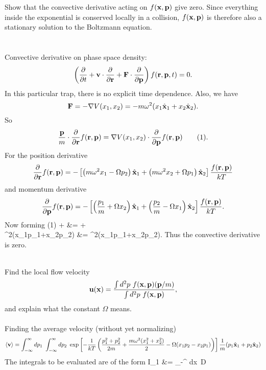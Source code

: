 \documentclass[11pt,letterpaper]{article}
\begin{document}
	\benum
		\item
            	Show that the convective derivative acting on $f(\mathbf{x},\mathbf{p})$ give zero. Since everything inside
		the exponential is conserved locally in a collision, $f(\mathbf{x},\mathbf{p})$ is therefore also a 
		stationary solution to the Boltzmann equation.
            	\\
		\\
		\\
		Convective derivative on phase space density:
		\[
			\left(\frac{\partial}{\partial t} +\mathbf{v}\cdot \frac{\partial}{\partial\mathbf{r}}+\mathbf{F}\cdot \frac{\partial}{\partial\mathbf{p}}\right)f(\mathbf{r},\mathbf{p},t) = 0.
		\]
		In this particular trap, there is no explicit time dependence. Also, we have
		\[
			\mathbf{F} = -\nabla V(x_1,x_2) = -m\omega^2(x_1\hat{\mathbf{x}}_1+x_2\hat{\mathbf{x}}_2).
		\]
		So
		\[
			\frac{\mathbf{p}}{m} \cdot\frac{\partial}{\partial\mathbf{r}}f(\mathbf{r},\mathbf{p}) = \nabla V(x_1,x_2)\cdot \frac{\partial}{\partial\mathbf{p}}
			f(\mathbf{r},\mathbf{p})\tag{1}.
		\]
		For the position derivative
		\[
			\frac{\partial}{\partial\mathbf{r}}f(\mathbf{r},\mathbf{p}) = -\left[ \left( m\omega^2 x_1-\Omega p_2\right)\hat{\mathbf{x}}_1+
			 \left( m\omega^2 x_2+\Omega p_1\right)\hat{\mathbf{x}}_2\right]\frac{f(\mathbf{r},\mathbf{p})}{kT}
		\]
		and momentum derivative
		\[
			\frac{\partial}{\partial\mathbf{p}}f(\mathbf{r},\mathbf{p}) = -\left[ \left( \frac{p_1}{m}+\Omega x_2\right)\hat{\mathbf{x}}_1 + 
			\left( \frac{p_2}{m}-\Omega x_1\right)\hat{\mathbf{x}}_2 \right]\frac{f(\mathbf{r},\mathbf{p})}{kT}.
		\]
		Now forming (1)
		\ba
			 + 
			 &= 
			 +
			 \\
			\omega^2(x_1p_1+x_2p_2) &= \omega^2(x_1p_1+x_2p_2).
		\ea
		Thus the convective derivative is zero.
		\\
		\\
		\item
		Find the local flow velocity 
		\[
			\mathbf{u}(\mathbf{x}) = \frac{\int d^2p\ f(\mathbf{x},\mathbf{p})(\mathbf{p}/m)}
			{\int d^2p\ f(\mathbf{x},\mathbf{p})},
		\]
		and explain what the constant $\Omega$ means.
		\\ \\
		Finding the average velocity (without yet normalizing)
		\[
			\braket{\vect v} = \int_{-\infty}^{\infty} dp_1\ \int_{-\infty}^{\infty} dp_2\ 
			\exp\blr{-\frac{1}{kT}\plr{\frac{p_1^2+p_2^2}{2m}+
			\frac{m\omega^2(x_1^2+x_2^2)}{2}-\Omega(x_1p_2-x_2p_1)}}\frac{1}{m}
			(p_1\vecth x_1+p_2\vecth x_2)
		\]
		The integrals to be evaluated are of the form
		\ba
			I_1 &= \int_{-\infty}^{\infty} dx\ \exp{}D \\
\end{document}
